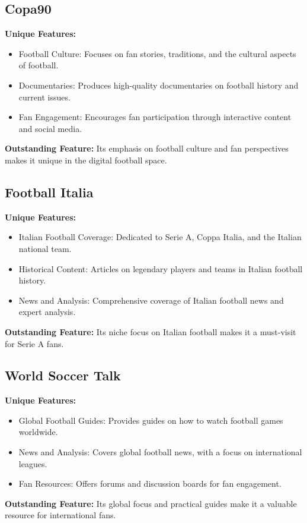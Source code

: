 \subsection{Copa90}
\textbf{Unique Features:}
\begin{itemize}
    \item Football Culture: Focuses on fan stories, traditions, and the cultural aspects of football.
    \item Documentaries: Produces high-quality documentaries on football history and current issues.
    \item Fan Engagement: Encourages fan participation through interactive content and social media.
\end{itemize}
\textbf{Outstanding Feature:} Its emphasis on football culture and fan perspectives makes it unique in the digital football space.

\subsection{Football Italia}
\textbf{Unique Features:}
\begin{itemize}
    \item Italian Football Coverage: Dedicated to Serie A, Coppa Italia, and the Italian national team.
    \item Historical Content: Articles on legendary players and teams in Italian football history.
    \item News and Analysis: Comprehensive coverage of Italian football news and expert analysis.
\end{itemize}
\textbf{Outstanding Feature:} Its niche focus on Italian football makes it a must-visit for Serie A fans.

\subsection{World Soccer Talk}
\textbf{Unique Features:}
\begin{itemize}
    \item Global Football Guides: Provides guides on how to watch football games worldwide.
    \item News and Analysis: Covers global football news, with a focus on international leagues.
    \item Fan Resources: Offers forums and discussion boards for fan engagement.
\end{itemize}
\textbf{Outstanding Feature:} Its global focus and practical guides make it a valuable resource for international fans.

